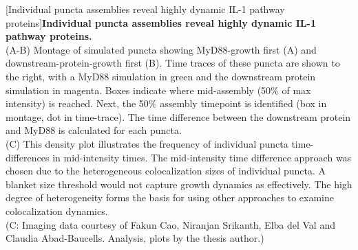 \begin{centering}
\captionsetup{parbox=none}
[Individual puncta assemblies reveal highly dynamic IL-1 pathway proteins]{\textbf{Individual puncta assemblies reveal highly dynamic IL-1 pathway proteins.}
\vspace{1em}
\\
(A-B) Montage of simulated puncta showing MyD88-growth first (A) and downstream-protein-growth first (B). Time traces of these puncta are shown to the right, with a MyD88 simulation in green and the downstream protein simulation in magenta. Boxes indicate where mid-assembly (50\% of max intensity) is reached. Next, the 50\% assembly timepoint is identified (box in montage, dot in time-trace). The time difference between the downstream protein and MyD88 is calculated for each puncta.
\vspace{1em}
\\
(C) This density plot illustrates the frequency of individual puncta time-differences in mid-intensity times. The mid-intensity time difference approach was chosen due to the heterogeneous colocalization sizes of individual puncta. A blanket size threshold would not capture growth dynamics as effectively. The high degree of heterogeneity forms the basis for using other approaches to examine colocalization dynamics.
\vspace{1em}
\\
(C: Imaging data courtesy of Fakun Cao, Niranjan Srikanth, Elba del Val and Claudia Abad-Baucells. Analysis, plots by the thesis author.)}
\label{p2:D1}
\end{centering}

